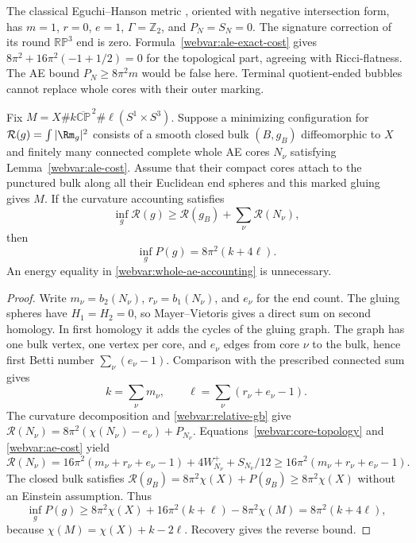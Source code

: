 The classical Eguchi--Hanson metric \cite{EguchiHanson1978},
oriented with negative intersection form, has
$m=1$, $r=0$, $e=1$, $\Gamma=\mathbb Z_2$, and $P_N=S_N=0$.
The signature correction of its round $\mathbb{RP}^3$ end is zero.
Formula~\eqref{webvar:ale-exact-cost} gives
$8\pi^2+16\pi^2(-1+1/2)=0$ for the topological part, agreeing with
Ricci-flatness.  The AE bound $P_N\ge8\pi^2m$ would be false here.
Terminal quotient-ended bubbles cannot replace whole cores with
their outer marking.

\begin{proposition}
\label{webvar:whole-ae-sharpness}
Fix $M=X\#k\overline{\mathbb{CP}}^{\,2}\#\ell(S^1\times S^3)$.
Suppose a minimizing configuration for
$\mathcal R(g)=\int|\Rm_g|^2$ consists of a smooth closed bulk
$(B,g_B)$ diffeomorphic to $X$ and finitely many connected complete
whole AE cores $N_\nu$ satisfying Lemma~\ref{webvar:ale-cost}.
Assume that their compact cores attach to the punctured bulk along
all their Euclidean end spheres and this marked gluing gives $M$.
If the curvature accounting satisfies
\begin{equation}\label{webvar:whole-ae-accounting}
 \inf_g\mathcal R(g)\ge\mathcal R(g_B)+\sum_\nu\mathcal R(N_\nu),
\end{equation}
then
\begin{equation}\label{webvar:whole-ae-result}
 \inf_gP(g)=8\pi^2(k+4\ell).
\end{equation}
An energy equality in \eqref{webvar:whole-ae-accounting} is unnecessary.
\end{proposition}
\begin{proof}
Write $m_\nu=b_2(N_\nu)$, $r_\nu=b_1(N_\nu)$, and $e_\nu$ for
the end count.  The gluing spheres have $H_1=H_2=0$, so
Mayer--Vietoris gives a direct sum on second homology.  In first
homology it adds the cycles of the gluing graph.  The graph has
one bulk vertex, one vertex per core, and $e_\nu$ edges from
core $\nu$ to the bulk, hence first Betti number
$\sum_\nu(e_\nu-1)$.  Comparison with the prescribed connected sum gives
\begin{equation}\label{webvar:marked-counts}
 k=\sum_\nu m_\nu,\qquad
 \ell=\sum_\nu(r_\nu+e_\nu-1).
\end{equation}
The curvature decomposition and \eqref{webvar:relative-gb} give
$\mathcal R(N_\nu)=8\pi^2(\chi(N_\nu)-e_\nu)+P_{N_\nu}$.
Equations~\eqref{webvar:core-topology} and \eqref{webvar:ae-cost} yield
\[
 \mathcal R(N_\nu)
 =16\pi^2(m_\nu+r_\nu+e_\nu-1)+4W_{N_\nu}^++S_{N_\nu}/12
 \ge16\pi^2(m_\nu+r_\nu+e_\nu-1).
\]
The closed bulk satisfies
$\mathcal R(g_B)=8\pi^2\chi(X)+P(g_B)\ge8\pi^2\chi(X)$ without
an Einstein assumption.  Thus
\[
 \inf_gP(g)\ge8\pi^2\chi(X)+16\pi^2(k+\ell)-8\pi^2\chi(M)
            =8\pi^2(k+4\ell),
\]
because $\chi(M)=\chi(X)+k-2\ell$.  Recovery gives the reverse bound.
\end{proof}

